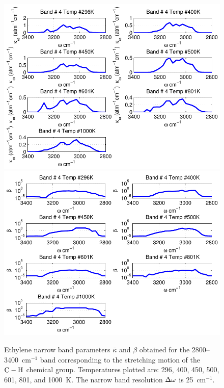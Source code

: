 \begin{figure}[p]
\begin{center}
\includegraphics[width=5.0in]{Figures/Ethylene_Kappa_Band4_MALKMUS.pdf}
\includegraphics[width=5.0in]{Figures/Ethylene_Beta_Band4_MALKMUS.pdf}
\end{center}
\caption{Ethylene narrow band parameters $\bar{\kappa}$ and $\beta$ obtained for the 2800--3400~cm$^{-1}$ band corresponding to the stretching motion of the $\rm C-H$ chemical group. Temperatures plotted are: 296, 400, 450, 500, 601, 801, and 1000~K. The narrow band resolution $\Delta \omega$ is 25~cm$^{-1}$.\label{fig:ethylene_kappa_beta4}}
\end{figure}

\FloatBarrier

